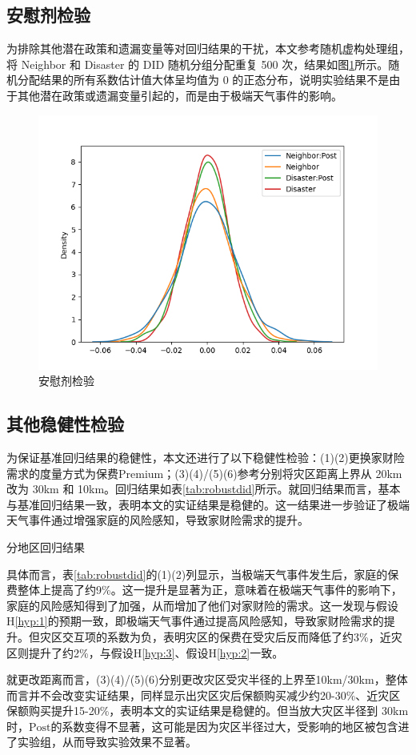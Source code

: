 \subsection{安慰剂检验}
为排除其他潜在政策和遗漏变量等对回归结果的干扰，本文参考\citet{CYJJ202104009}随机虚构处理组，将 Neighbor 和 Disaster 的 DID 随机分组分配重复 500 次，结果如图\ref{fig:randomtest}所示。随机分配结果的所有系数估计值大体呈均值为 0 的正态分布，说明实验结果不是由于其他潜在政策或遗漏变量引起的，而是由于极端天气事件的影响。
\begin{figure}[H]
    \includegraphics[width=\linewidth]{lib/img/randomtest.png}
    \caption{安慰剂检验}\label{fig:randomtest}
\end{figure}

\subsection{其他稳健性检验}

为保证基准回归结果的稳健性，本文还进行了以下稳健性检验：(1)(2)更换家财险需求的度量方式为保费Premium；(3)(4)/(5)(6)参考\citet{alok2020fund}分别将灾区距离上界从 20km 改为 30km 和 10km。回归结果如表\ref{tab:robustdid}所示。就回归结果而言，基本与基准回归结果一致，表明本文的实证结果是稳健的。这一结果进一步验证了极端天气事件通过增强家庭的风险感知，导致家财险需求的提升。
\begin{table}
    \centering
    \caption{分地区回归结果}\label{tab:robustdid}
    
\end{table}

具体而言，表\ref{tab:robustdid}的(1)(2)列显示，当极端天气事件发生后，家庭的保费整体上提高了约9\%。这一提升是显著为正，意味着在极端天气事件的影响下，家庭的风险感知得到了加强，从而增加了他们对家财险的需求。这一发现与假设H\ref{hyp:1}的预期一致，即极端天气事件通过提高风险感知，导致家财险需求的提升。但灾区交互项的系数为负，表明灾区的保费在受灾后反而降低了约3\%，近灾区则提升了约2\%，与假设H\ref{hyp:3}、假设H\ref{hyp:2}一致。

就更改距离而言，(3)(4)/(5)(6)分别更改灾区受灾半径的上界至10km/30km，整体而言并不会改变实证结果，同样显示出灾区灾后保额购买减少约20-30\%、近灾区保额购买提升15-20\%，表明本文的实证结果是稳健的。但当放大灾区半径到 30km 时，$\text{Post}$的系数变得不显著，这可能是因为灾区半径过大，受影响的地区被包含进了实验组，从而导致实验效果不显著。
